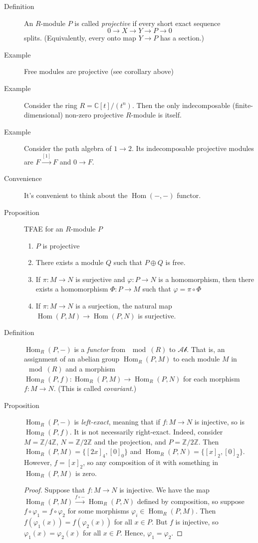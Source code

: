 \documentclass[12pt]{article}
\newcommand{\bbC}{\mathbb{C}}
\newcommand{\bbZ}{\mathbb{Z}}
\newcommand{\Ab}{\mathcal{Ab}}
\newcommand{\Hom}{\operatorname{Hom}}
\begin{document}
\begin{description}
 
\item[Definition] An $R$-module $P$ is called \emph{projective} if
  every short exact sequence \[0 \rightarrow X \rightarrow Y
    \rightarrow P \rightarrow 0 \] splits. (Equivalently, every onto
  map $Y\rightarrow P$ has a section.)
\item[Example] Free modules are projective (see corollary above)
\item[Example] Consider the ring $R=\bbC[t]/(t^n)$. Then the only indecomposable
  (finite-dimensional) non-zero projective $R$-module is itself. 
\item[Example] Consider the path algebra of $1\rightarrow 2$. Its
  indecomposable projective modules are $F \xrightarrow{[1]} F$ and
  $0\xrightarrow{} F$. 
\item[Convenience] It's convenient to think about the $\Hom(-,-)$
  functor. 
\item[Proposition] TFAE for an $R$-module $P$
  \begin{enumerate}
  \item $P$ is projective
  \item There exists a module $Q$ such that $P\oplus Q$ is free.
    \item If $\pi: M\rightarrow N$ is surjective and $\varphi:
      P\rightarrow N$ is a homomorphism, then there exists a
      homomorphism $\Phi: P\rightarrow M$ such that $\varphi= \pi
      \circ \Phi$
    \item If $\pi: M\rightarrow N$ is a surjection, the natural map
      $\Hom(P, M) \rightarrow \Hom(P,N)$ is surjective. 
  \end{enumerate}
\item[Definition] $\Hom_R(P,-)$ is a \emph{functor} from $\mod(R)$ to
  $\Ab$. That is, an assignment of an abelian group $\Hom_R(P,M)$ to
  each module $M$ in $\mod(R)$ and a morphism $\Hom_R(P,f):
  \Hom_R(P,M)\rightarrow \Hom_R(P,N)$ for each
  morphism $f: M\rightarrow N$. (This is called \emph{covariant}.)
\item[Proposition] $\Hom_R(P,-)$ is \emph{left-exact}, meaning that if
  $f:M\rightarrow N$ is injective, so is $\Hom_R(P,f)$. It is not
  necessarily right-exact. Indeed, consider $M=\bbZ/4\bbZ$,
  $N=\bbZ/2\bbZ$ and the projection, and $P=\bbZ/2\bbZ$. Then
  $\Hom_R(P,M)=\{[2x]_4, [0]_0\}$ and $\Hom_R(P,N)= \{[x]_2,
  [0]_2\}$. However, $f=[x]_2$, so any composition of it with
  something in $\Hom_R(P,M)$ is zero.
  \begin{proof}
    Suppose that $f:M\rightarrow N$ is injective. We have the map
    $\Hom_R(P,M)\xrightarrow{f\circ -} \Hom_R(P,N)$ defined by
    composition, so suppose $f\circ \varphi_1 = f\circ \varphi_2$ for
    some morphisms $\varphi_i \in \Hom_R(P,M)$. Then
    $f(\varphi_1(x))=f(\varphi_2(x))$ for all $x\in P$. But $f$ is
    injective, so $\varphi_1(x)=\varphi_2(x)$ for all $x\in P$. Hence,
    $\varphi_1=\varphi_2$. 
  \end{proof}


\end{description}
\end{document}
